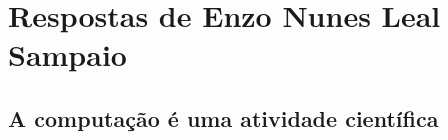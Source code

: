 \section{Respostas de Enzo Nunes Leal Sampaio}

\subsection{A computação é uma atividade científica}